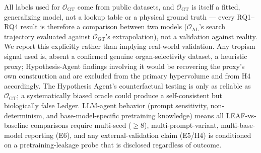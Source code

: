 \documentclass{article}
\begin{document}
All labels used
for $\mathcal{O}_{\text{GT}}$ come from public datasets, and
$\mathcal{O}_{\text{GT}}$ is itself a fitted, generalizing model, not a
lookup table or a physical ground truth --- every RQ1--RQ4 result is
therefore a comparison between two models ($\mathcal{O}_{\text{AL}}$'s
search trajectory evaluated against $\mathcal{O}_{\text{GT}}$'s
extrapolation), not a validation against reality. We report this
explicitly rather than implying real-world validation. Any tropism signal
used is, absent a confirmed genuine organ-selectivity dataset, a heuristic
proxy; Hypothesis-Agent findings involving it would be recovering the
proxy's own construction and are excluded from the primary hypervolume and
from H4 accordingly. The Hypothesis Agent's counterfactual testing is only
as reliable as $\mathcal{O}_{\text{GT}}$; a systematically biased oracle
could produce a self-consistent but biologically false Ledger. LLM-agent
behavior (prompt sensitivity, non-determinism, and base-model-specific
pretraining knowledge) means all LEAF-vs-baseline comparisons require
multi-seed ($\ge 8$), multi-prompt-variant, multi-base-model reporting
(E6), and any external-validation claim (E5/H4) is conditioned on a
pretraining-leakage probe that is disclosed regardless of outcome.
\end{document}
